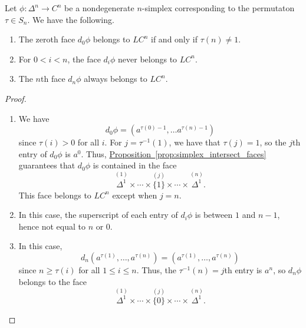 \documentclass[main.tex]{subfiles}
\begin{document}
\begin{lemma}
  \label{lemma:first_and_last_face}
  Let $\phi\colon \Delta^{n} \to C^{n}$ be a nondegenerate $n$-simplex corresponding to the permutaton $\tau \in S_{n}$. We have the following.
  \begin{enumerate}
    \item The zeroth face $d_{0}\phi$ belongs to $LC^{n}$ if and only if $\tau(n) \neq 1$.

    \item For $0 < i < n$, the face $d_{i}\phi$ never belongs to $LC^{n}$.

    \item The $n$th face $d_{n}\phi$ always belongs to $LC^{n}$.
  \end{enumerate}
\end{lemma}
\begin{proof}
  \begin{enumerate}
    \item We have
      \begin{equation*}
        d_{0}\phi = (a^{\tau(0) - 1}, \ldots a^{\tau(n)-1})
      \end{equation*}
      since $\tau(i) > 0$ for all $i$. For $j = \tau^{-1}(1)$, we have that $\tau(j) = 1$, so the $j$th entry of $d_{0}\phi$ is $a^{0}$. Thus, \hyperref[prop:simplex_intersect_faces]{Proposition~\ref*{prop:simplex_intersect_faces}} guarantees that $d_{0}\phi$ is contained in the face
      \begin{equation*}
        \overset{(1)}{\Delta^{1}} \times \cdots \times \overset{(j)}{\{1\}} \times \cdots \times \overset{(n)}{\Delta^{1}}.
      \end{equation*}
      This face belongs to $LC^{n}$ except when $j = n$.

    \item In this case, the superscript of each entry of $d_{i}\phi$ is between $1$ and $n-1$, hence not equal to $n$ or $0$.

    \item In this case,
      \begin{equation*}
        d_{n}(a^{\tau(1)}, \ldots, a^{\tau(n)}) = (a^{\tau(1)}, \ldots, a^{\tau(n)})
      \end{equation*}
      since $n \geq \tau(i)$ for all $1 \leq i \leq n$. Thus, the $\tau^{-1}(n) = j$th entry is $a^{n}$, so $d_{n}\phi$ belongs to the face
      \begin{equation*}
        \overset{(1)}{\Delta^{1}} \times \cdots \times \overset{(j)}{\{0\}} \times \cdots \times \overset{(n)}{\Delta^{1}}.
      \end{equation*}
  \end{enumerate}
\end{proof}
\end{document}
